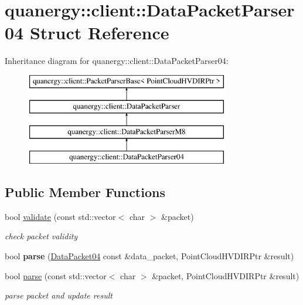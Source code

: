 \hypertarget{structquanergy_1_1client_1_1DataPacketParser04}{\section{quanergy\-:\-:client\-:\-:Data\-Packet\-Parser04 Struct Reference}
\label{structquanergy_1_1client_1_1DataPacketParser04}
}
Inheritance diagram for quanergy\-:\-:client\-:\-:Data\-Packet\-Parser04\-:\begin{figure}[H]
\begin{center}
\leavevmode
\includegraphics[height=4.000000cm]{structquanergy_1_1client_1_1DataPacketParser04}
\end{center}
\end{figure}
\subsection*{Public Member Functions}
\begin{DoxyCompactItemize}
\item 
bool \hyperlink{structquanergy_1_1client_1_1DataPacketParser04_a4f8566ff529171e458ab2139c9098403}{validate} (const std\-::vector$<$ char $>$ \&packet)
\begin{DoxyCompactList}\small\item\em check packet validity \end{DoxyCompactList}\item 
\hypertarget{structquanergy_1_1client_1_1DataPacketParser04_aa4d5c0f05ceb47c1fa5abdbb2a6ceae1}{bool {\bfseries parse} (\hyperlink{structquanergy_1_1client_1_1DataPacket04}{Data\-Packet04} const \&data\-\_\-packet, Point\-Cloud\-H\-V\-D\-I\-R\-Ptr \&result)}\label{structquanergy_1_1client_1_1DataPacketParser04_aa4d5c0f05ceb47c1fa5abdbb2a6ceae1}

\item 
bool \hyperlink{structquanergy_1_1client_1_1DataPacketParser04_a62df767eabc53340282c4f3cb5fec9e0}{parse} (const std\-::vector$<$ char $>$ \&packet, Point\-Cloud\-H\-V\-D\-I\-R\-Ptr \&result)
\begin{DoxyCompactList}\small\item\em parse packet and update result \end{DoxyCompactList}\end{DoxyCompactItemize}
